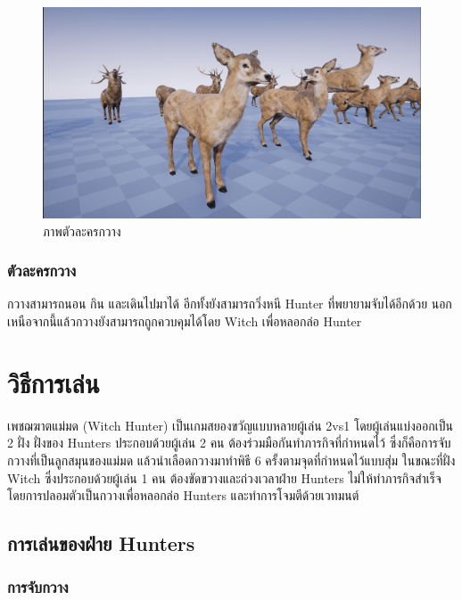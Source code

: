 \begin{figure}[p]
  \begin{center}
  \includegraphics[width=\textwidth]{./img/characters/deerdoe.png}
  \end{center}
  \caption[ภาพตัวละครกวาง]{ภาพตัวละครกวาง}
  \label{fig:deer}
\end{figure}

\subsubsection{ตัวละครกวาง}

กวางสามารถนอน กิน และเดินไปมาได้ อีกทั้งยังสามารถวิ่งหนี Hunter ที่พยายามจับได้อีกด้วย นอกเหนือจากนี้แล้วกวางยังสามารถถูกควบคุมได้โดย Witch เพื่อหลอกล่อ Hunter

\section{วิธีการเล่น}

เพชฌฆาตแม่มด (Witch Hunter) เป็นเกมสยองขวัญแบบหลายผู้เล่น 2vs1 โดยผู้เล่นแบ่งออกเป็น 2 ฝั่ง 
ฝั่งของ Hunters ประกอบด้วยผู้เล่น 2 คน ต้องร่วมมือกันทำภารกิจที่กำหนดไว้ ซึ่งก็คือการจับกวางที่เป็นลูกสมุนของแม่มด 
แล้วนำเลือดกวางมาทำพิธี 6 ครั้งตามจุดที่กำหนดไว้แบบสุ่ม ในขณะที่ฝั่ง Witch ซึ่งประกอบด้วยผู้เล่น 1 คน
ต้องขัดขวางและถ่วงเวลาฝ่าย Hunters ไม่ให้ทำภารกิจสำเร็จ โดยการปลอมตัวเป็นกวางเพื่อหลอกล่อ Hunters และทำการโจมตีด้วยเวทมนต์

\subsection{การเล่นของฝ่าย Hunters}

\subsubsection{การจับกวาง}

